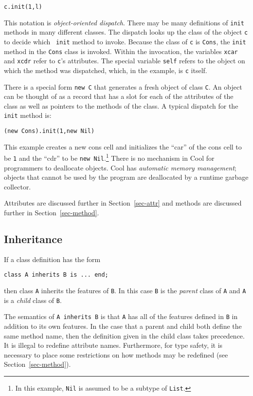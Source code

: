 \begin{verbatim}
c.init(1,l)
\end{verbatim}

This notation is {\em object-oriented dispatch}.  There may be many
definitions of {\tt init} methods in many different classes.  The
dispatch looks up the class of the object {\tt c} to decide which {\tt
init} method to invoke.  Because the class of {\tt c} is {\tt Cons},
the {\tt init} method in the {\tt Cons} class is invoked.  Within the
invocation, the variables {\tt xcar} and {\tt xcdr} refer to {\tt c}'s
attributes.  The special variable {\tt self} refers to the object on
which the method was dispatched, which, in the example, is {\tt c} itself.

There is a special form {\tt new C} that generates a fresh object of
class {\tt C}.  An object can be thought of as a record that has a
slot for each of the attributes of the class as well as
pointers to the methods of the class.
A typical dispatch for the {\tt init} method is:
\begin{verbatim}
(new Cons).init(1,new Nil)
\end{verbatim}
This example creates a new cons cell and initializes the ``car'' of
the cons cell to be {\tt 1} and the ``cdr'' to be {\tt new
Nil}.\footnote{In this example, {\tt Nil} is assumed to be a subtype
of {\tt List}.} There is no mechanism in Cool for programmers to
deallocate objects.  Cool has {\em automatic memory management};
objects that cannot be used by the program are deallocated by a
runtime garbage collector.


Attributes are discussed further in Section~\ref{sec-attr}
and methods are discussed further in Section~\ref{sec-method}.


\subsection{Inheritance}
\label{sec-inherit}

If a class definition has the form
\begin{verbatim}
class A inherits B is ... end;
\end{verbatim}
then class {\tt A} inherits the features of {\tt B}.
In this case {\tt B} is the {\em parent} class of {\tt A}
and {\tt A} is a {\em child} class of {\tt B}.

The semantics of {\tt A inherits B} is that {\tt A} has all of the
features defined in {\tt B} in addition to its own features.
In the case that a parent and child both define the same method
name, then the definition given in the child class takes precedence.
It is illegal to redefine attribute names.  Furthermore, for type safety,
it is necessary to place some restrictions on how methods may be redefined
(see Section~\ref{sec-method}).

